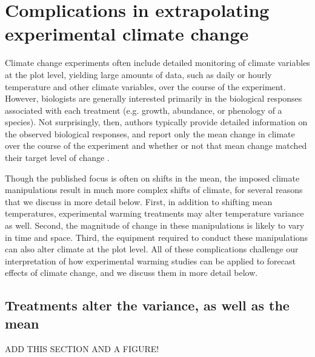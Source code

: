 \documentclass{article}
\begin{document}
\section* {Complications in extrapolating experimental climate change}
Climate change experiments often include detailed monitoring of climate variables at the plot level, yielding large amounts of data, such as daily or hourly temperature and other climate variables, over the course of the experiment. However, biologists are generally interested primarily in the biological responses associated with each treatment (e.g. growth, abundance, or phenology of a species). Not surprisingly, then, authors typically provide detailed information on the observed biological responses, and report only the mean change in climate over the course of the experiment and whether or not that mean change matched their target level of change \citep{price1998,clark2014a,clark2014b,rollinson2012}. 
\par Though the published focus is often on shifts in the mean, the imposed climate manipulations result in much more complex shifts of climate, for several reasons that we discuss in more detail below. First, in addition to shifting mean temperatures, experimental warming treatments may alter temperature variance as well. Second, the magnitude of change in these manipulations is likely to vary in time and space. Third, the equipment required to conduct these manipulations can also alter climate at the plot level. All of these complications challenge our interpretation of how experimental warming studies can be applied to forecast effects of climate change, and we discuss them in more detail below.
\subsection* {Treatments alter the variance, as well as the mean}
ADD THIS SECTION AND A FIGURE!
\end{document}
